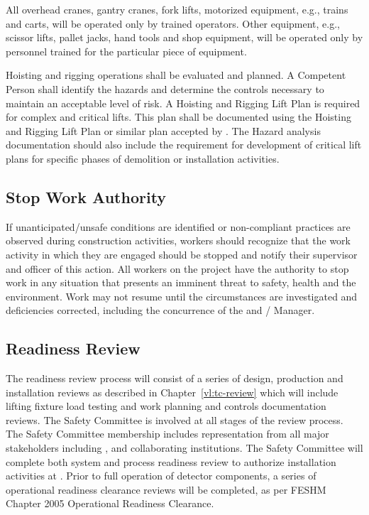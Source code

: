 All overhead cranes, gantry cranes, fork lifts, motorized equipment,
e.g., trains and carts, will be operated only by trained
operators. Other equipment, e.g., scissor lifts, pallet jacks, hand
tools and shop equipment, will be operated only by personnel trained
for the particular piece of equipment.

Hoisting and rigging operations shall be evaluated and planned.  A
Competent Person  shall identify the
hazards and determine the controls necessary to maintain an acceptable
level of risk.  A Hoisting and Rigging Lift Plan is required for
complex and critical lifts. This plan shall be documented using the
\fnal Hoisting and Rigging Lift Plan or similar plan accepted by
\fnal. The Hazard analysis documentation should also include the
requirement for development of critical lift plans for specific phases
of demolition or installation activities.

\subsection{Stop Work Authority}

If unanticipated/unsafe conditions are identified or non-compliant
practices are observed during construction activities, workers should
recognize that the work activity in which they are engaged should be
stopped and notify their supervisor and  officer of
this action. All workers on the  project have the
authority to stop work in any situation that presents an imminent
threat to safety, health and the environment. Work may not resume
until the circumstances are investigated and deficiencies corrected,
including the concurrence of the  
and /  Manager.

\subsection{ Readiness Review}

The  readiness review process will consist of a series of
design, production and installation reviews as described in
Chapter~\ref{vl:tc-review} which will include lifting fixture load
testing and work planning and controls documentation reviews. The
 Safety Committee is involved at all stages of the review
process.  The  Safety Committee membership includes
representation from all major stakeholders including \fnal,  and
 collaborating institutions. The  Safety
Committee will complete both system and process readiness review to
authorize installation activities at .  Prior to full operation
of detector components, a series of operational readiness clearance
reviews will be completed, as per FESHM Chapter 2005 Operational
Readiness Clearance.

